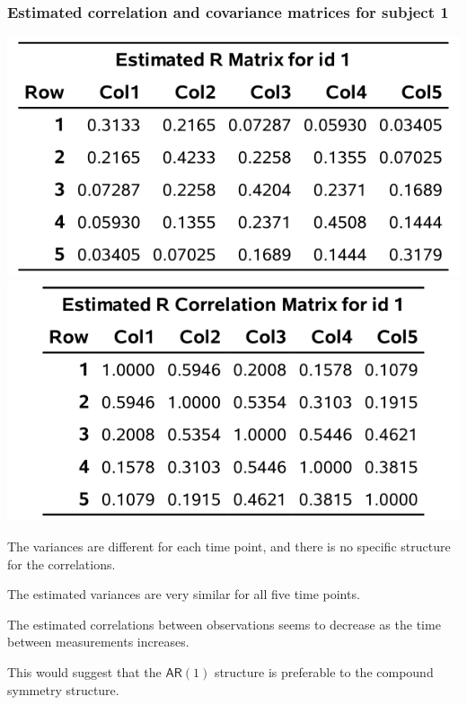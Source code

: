 \documentclass{beamer}
\begin{document}
\begin{frame}[fragile]
\frametitle{Estimated correlation and covariance matrices for subject 1}
\begin{center}
\includegraphics[width = 0.45\linewidth]{img/c5/slides6-e21a}
\includegraphics[width = 0.45\linewidth]{img/c5/slides6-e21b}
\end{center}
\bi
\item The variances are different for each time point, and there is no specific structure for the correlations.
\be

\item The estimated variances are very similar for all five time points. 
\item The estimated correlations between observations seems to decrease as the time between measurements increases. 
\ee
\item This would suggest that the $\mathsf{AR}(1)$ structure is preferable to the compound symmetry structure.
\ei
\end{frame}
\end{document}
